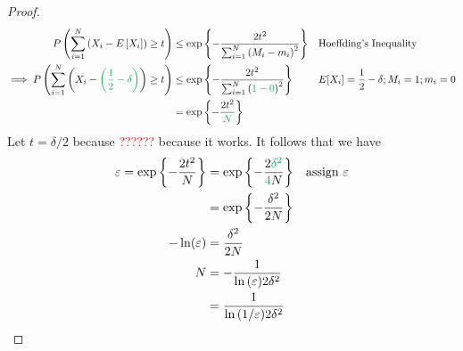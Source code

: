 \begin{proof}
    \begin{align*}
    \Prob{\sum_{i=1}^{N}\left(X_i - \Expect{X_i}\right) \geq t} &\leq \exponential{-\frac{2t^2}{\sum_{i=1}^{N}\left(M_i - m_i\right)^2}} && \text{Hoeffding's Inequality} \\ 
    \implies \Prob{\sum_{i=1}^{N}\left(X_i - \textcolor{\darkgreen}{ \left(\frac{1}{2} - \delta \right)}\right) \geq t} &\leq \exponential{-\frac{2t^2}{\sum_{i=1}^{N}\left(\textcolor{\darkgreen}{1 - 0}\right)^2}} && \text{$E[X_i] = \frac{1}{2} - \delta; M_i = 1; m_i = 0$} \\ 
    &= \exponential{-\frac{2t^2}{\textcolor{\darkgreen}{N}}} 
    \end{align*}
    Let $t = \delta/2$ because \textcolor{red}{??????} because it works.
    It follows that we have
    \begin{align*}
    \varepsilon = \exponential{-\frac{2t^2}{N}} &= \exponential{-\frac{2\textcolor{\darkgreen}{\delta^2}}{\textcolor{\darkgreen}{4 }N}} && 
        \text{assign $\varepsilon$} \\ 
    &= \exponential{-\frac{\delta^2}{2 N}} && 
        \text{} \\ 
    -\ln(\varepsilon)  &= \frac{\delta^2}{2 N} \\ 
    N &= -\frac{1}{\ln{(\varepsilon)}2\delta^2} \\ 
    &= \frac{1}{\ln{(1/\varepsilon)} 2\delta^2} 
    \end{align*}
\end{proof}


